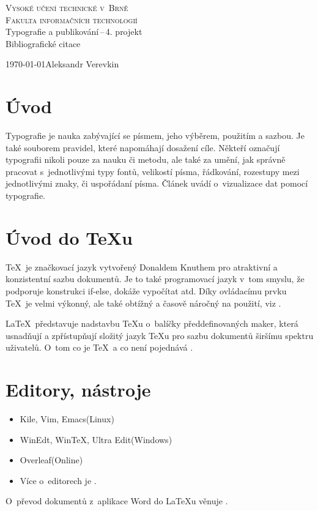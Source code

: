 \documentclass[a4paper, 11pt]{article}
\begin{document}
\begin{titlepage}

\begin{center}
\Huge
\textsc{Vysoké učení technické v~Brně}\\
\huge
\textsc{Fakulta informačních technologií}\\
\LARGE
Typografie a publikování\,--\,4. projekt\\
\Huge
Bibliografické citace\\
\end{center}
{\Large \today \hfill Aleksandr Verevkin}

\end{titlepage}

\section{Úvod}
Typografie je nauka zabývající se písmem, jeho výběrem, použitím a sazbou. 
Je také souborem pravidel, které napomáhají dosažení cíle.
Někteří označují typografii nikoli pouze za nauku či metodu, ale také za umění, jak správně 
pracovat s~jednotlivými typy fontů, velikostí písma, řádkování, rozestupy mezi jednotlivými 
znaky, či uspořádaní písma. Článek \cite{TypografieArticle} uvádí o~vizualizace dat pomocí typografie.

\section{Úvod do \TeX u}
\TeX\ je značkovací jazyk vytvořený Donaldem Knuthem pro atraktivní a konzistentní sazbu dokumentů.
Je to také programovací jazyk v~tom smyslu, že podporuje konstrukci if-else, dokáže vypočítat atd.
Díky ovládacímu prvku \TeX\ je velmi výkonný, ale také obtížný a časově náročný na použití,
viz \cite{book2006}.

\LaTeX\ představuje nadstavbu \TeX u o~balíčky předdefinovaných maker, 
která usnadňují a zpřístupňují složitý jazyk \TeX u pro sazbu dokumentů širšímu spektru uživatelů.
O~tom co je \TeX\ a co není pojednává \cite{onlineFEKT}.

\section{Editory, nástroje}
\begin{itemize}
    \item Kile, Vim, Emacs(Linux)
    \item WinEdt, WinTeX, Ultra Edit(Windows)
    \item Overleaf(Online)
    \item Více o~editorech je \cite{onlineFIT}.
\end{itemize}
O~převod dokumentů z~aplikace Word do \LaTeX u věnuje \cite{WorkSimek}.
\end{document}
